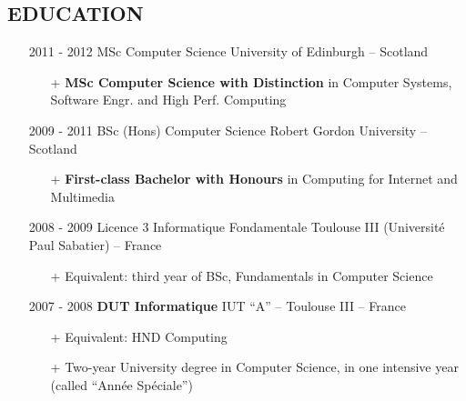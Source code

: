 \documentclass{res}
\begin{document}
  
\ifisanon
        \address{Some parts were removed. These are highlighted by \textit{(Anonymous)}}
\else

        \address{ \faMapMarker~Kempische Steenweg 396/4.1, 3500 Hasselt, Belgium \\ 📧 samuel@giffard.co ~~ \faMobile~+32 (0) 4-84-14-10-33 \\ \\ \textbf{Python Trainer, Engineer \& Evangelist} }
\fi

\begin{resume}
 
\section{EDUCATION}       
\begin{itemize} 
\item[] 2011 - 2012 \tabto{2cm} MSc Computer Science \hfill University of Edinburgh -- Scotland 
        \begin{itemize}
                \item[+] \textbf{MSc Computer Science with Distinction} in Computer Systems, Software Engr. and High Perf. Computing
        \end{itemize}
        
\item[] 2009 - 2011 \tabto{2cm} BSc (Hons) Computer Science \hfill Robert Gordon University -- Scotland 
        \begin{itemize}
                \item[+] \textbf{First-class Bachelor with Honours} in Computing for Internet and Multimedia
        \end{itemize}
        
\item[] 2008 - 2009 \tabto{2cm} Licence 3 Informatique Fondamentale \hfill Toulouse III (Universit\'e Paul Sabatier) -- France
        \begin{itemize}
                \item[+] Equivalent: third year of BSc, Fundamentals in Computer Science
        \end{itemize}

\item[] 2007 - 2008 \tabto{2cm} \textbf{DUT Informatique} \hfill IUT ``A'' -- Toulouse III -- France
        \begin{itemize}
                \item[+] Equivalent: HND Computing
                \item[+] Two-year University degree in Computer Science, in one intensive year (called ``Ann\'ee Sp\'eciale'')
        \end{itemize}


\end{itemize}
\end{resume}
\end{document}
